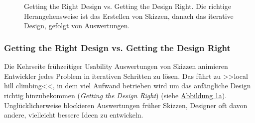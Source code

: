 \begin{figure}
	\myfloatalign
	 \\
	 \\
	\caption[Getting the Right Design vs. Getting the Design Right. \newline \citep{Greenberg:2008}]{Getting the Right Design vs. Getting the Design Right. Die richtige Herangehensweise ist das Erstellen von Skizzen, danach das iterative Design, gefolgt von Auswertungen.}\label{fig:greenbergBuxtonRightDesign}
\end{figure}

\subsubsection{Getting the Right Design vs. Getting the Design Right}  \label{sssec:rightDesign}
Die Kehrseite frühzeitiger Usability Auswertungen von Skizzen animieren Entwickler jedes Problem in iterativen Schritten zu lösen. Das führt zu >>local hill climbing<<, in dem viel Aufwand betrieben wird um das anfängliche Design richtig hinzubekommen (\emph{Getting the Design Right}) (siehe \hyperref[fig:greenbergBuxtonRightDesign]{Abbildung \ref{fig:greenbergBuxtonRightDesign}a}). Unglücklicherweise blockieren Auswertungen früher Skizzen, Designer oft davon andere, vielleicht bessere Ideen zu entwickeln. \citep{Greenberg:2008}

